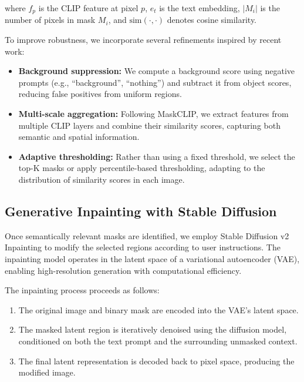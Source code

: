 where $f_p$ is the CLIP feature at pixel $p$, $e_t$ is the text embedding, $|M_i|$ is the number of pixels in mask $M_i$, and $\text{sim}(\cdot, \cdot)$ denotes cosine similarity.

To improve robustness, we incorporate several refinements inspired by recent work:

\begin{itemize}
    \item \textbf{Background suppression:} We compute a background score using negative prompts (e.g., ``background'', ``nothing'') and subtract it from object scores, reducing false positives from uniform regions.

    \item \textbf{Multi-scale aggregation:} Following MaskCLIP, we extract features from multiple CLIP layers and combine their similarity scores, capturing both semantic and spatial information.

    \item \textbf{Adaptive thresholding:} Rather than using a fixed threshold, we select the top-K masks or apply percentile-based thresholding, adapting to the distribution of similarity scores in each image.
\end{itemize}

\subsection{Generative Inpainting with Stable Diffusion}

Once semantically relevant masks are identified, we employ Stable Diffusion v2 Inpainting \cite{rombach2022high} to modify the selected regions according to user instructions. The inpainting model operates in the latent space of a variational autoencoder (VAE), enabling high-resolution generation with computational efficiency.

The inpainting process proceeds as follows:
\begin{enumerate}
    \item The original image and binary mask are encoded into the VAE's latent space.
    \item The masked latent region is iteratively denoised using the diffusion model, conditioned on both the text prompt and the surrounding unmasked context.
    \item The final latent representation is decoded back to pixel space, producing the modified image.
\end{enumerate}

